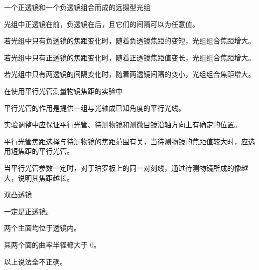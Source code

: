 \documentclass[padl, analysis, notocnum]{ExBook}
\newcommand{\answerarea}[1][3.5cm]{%
  \par\vspace{1mm}%
  \noindent{\color{themeColor!35}\rule{\linewidth}{0.4pt}}\par
  \noindent\begin{minipage}[t][#1][t]{\linewidth}\vspace{0pt}\end{minipage}\par
  \noindent{\color{themeColor!35}\rule{\linewidth}{0.4pt}}\par
}
\begin{document}
\begin{qitems}[startnum=11]
\qitem 一个正透镜和一个负透镜组合而成的远摄型光组
\par\noindent\hspace{2em}光组中正透镜在前，负透镜在后，且它们的间隔可以为任意值。
\par\noindent\hspace{2em}若光组中只有负透镜的焦距变化时，随着负透镜焦距的变短，光组组合焦距增大。
\par\noindent\hspace{2em}若光组中只有正透镜的焦距变化时，随着正透镜焦距值变长，光组组合焦距增大。
\par\noindent\hspace{2em}若光组中只有两透镜的间隔变化时，随着两透镜间隔的变小，光组组合焦距增大。
\label{q:28:start}
\answerarea[4.0cm]
\label{q:28:end}
\end{qitems}

\begin{qitems}[startnum=12]
\qitem 在使用平行光管测量物镜焦距的实验中
\par\noindent\hspace{2em}平行光管的作用是提供一组与光轴成已知角度的平行光线。
\par\noindent\hspace{2em}实验调整中应保证平行光管、待测物镜和测微目镜沿轴方向上有确定的位置。
\par\noindent\hspace{2em}平行光管焦距选择与待测物镜的焦距范围有关，当待测物镜的焦距值较大时，应选用短焦距的平行光管。
\par\noindent\hspace{2em}当平行光管参数一定时，对于珀罗板上的同一对刻线，通过待测物镜所成的像越大，说明其焦距越长。
\label{q:29:start}
\answerarea[4.0cm]
\label{q:29:end}
\end{qitems}

\begin{qitems}[startnum=13]
\qitem 双凸透镜
\par\noindent\hspace{2em}一定是正透镜。
\par\noindent\hspace{2em}两个主面均位于透镜内。
\par\noindent\hspace{2em}其两个面的曲率半径都大于 0。
\par\noindent\hspace{2em}以上说法全不正确。
\label{q:30:start}
\answerarea[4.0cm]
\label{q:30:end}
\end{qitems}
\end{document}
